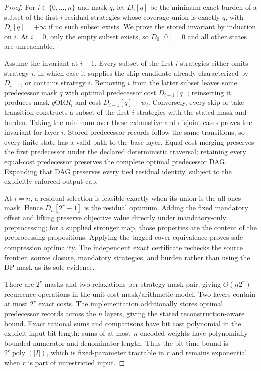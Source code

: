 \begin{proof}
For $i\in\{0,\ldots,n\}$ and mask $q$, let $D_i[q]$ be the minimum exact
burden of a subset of the first $i$ residual strategies whose coverage union
is exactly $q$, with $D_i[q]=+\infty$ if no such subset exists.  We prove the
stored invariant by induction on $i$.  At $i=0$, only the empty subset exists,
so $D_0[0]=0$ and all other states are unreachable.

Assume the invariant at $i-1$.  Every subset of the first $i$ strategies
either omits strategy $i$, in which case it supplies the skip candidate already
characterized by $D_{i-1}$, or contains strategy $i$.  Removing $i$ from the
latter subset leaves some predecessor mask $q$ with optimal predecessor cost
$D_{i-1}[q]$; reinserting it produces mask $q\mathbin{\mathrm{OR}}R_i$ and
cost $D_{i-1}[q]+w_i$.  Conversely, every skip or take transition constructs
a subset of the first $i$ strategies with the stated mask and burden.  Taking
the minimum over these exhaustive and disjoint cases proves the invariant for
layer $i$.  Stored predecessor records follow the same transitions, so every
finite state has a valid path to the base layer.  Equal-cost merging preserves
the first predecessor under the declared deterministic traversal; retaining
every equal-cost predecessor preserves the complete optimal predecessor DAG.
Expanding that DAG preserves every tied residual identity, subject to the
explicitly enforced output cap.

At $i=n$, a residual selection is feasible exactly when its union is the
all-ones mask.  Hence $D_n[2^r-1]$ is the residual optimum.  Adding the fixed
mandatory offset and lifting preserve objective value directly under
mandatory-only preprocessing; for a supplied stronger map, those properties
are the content of the preprocessing propositions.  Applying the tagged-cover
equivalence proves safe-compression optimality.  The independent exact
certificate rechecks the source frontier, source closure, mandatory
strategies, and burden rather than using the DP mask as its sole evidence.

There are $2^r$ masks and two relaxations per strategy-mask pair, giving
$O(n2^r)$ recurrence operations in the unit-cost mask/arithmetic model.  Two
layers contain at most $2^r$ exact costs.  The implementation additionally
stores optimal predecessor records across the $n$ layers, giving the stated
reconstruction-aware bound.  Exact rational sums and comparisons have bit
cost polynomial in the explicit input bit length: sums of at most $n$ encoded
weights have polynomially bounded numerator and denominator length.  Thus the
bit-time bound is $2^r\operatorname{poly}(|I|)$, which is fixed-parameter
tractable in $r$ and remains exponential when $r$ is part of unrestricted
input.
\end{proof}

